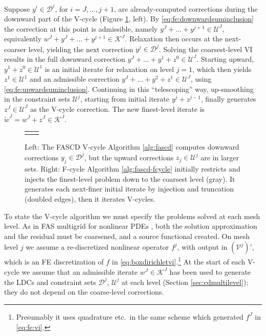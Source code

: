 \documentclass[review,hidelinks,onefignum,onetabnum]{siamart220329}
\newcommand{\cV}{\mathcal{V}}
\begin{document}
Suppose $y^i \in \mathcal{D}^i$, for $i=J,\dots,j+1$, are already-computed corrections during the downward part of the V-cycle (Figure \ref{fig:fascdcycles}, left).  By \eqref{eq:fe:downwardsuminclusion} the correction at this point is admissible, namely $y^J + \dots + y^{j+1} \in \mathcal{U}^J$, equivalently $w^J + y^J + \dots + y^{j+1} \in \mathcal{K}^J$.  Relaxation then occurs at the next-coarser level, yielding the next correction $y^j \in \mathcal{D}^j$.  Solving the coarsest-level VI results in the full downward correction $y^J + \dots + y^1 + z^0 \in \mathcal{U}^J$.  Starting upward, $y^1 + z^0 \in \mathcal{U}^1$ is an initial iterate for relaxation on level $j=1$, which then yields $z^1 \in \mathcal{U}^1$ and an admissible correction $y^J + \dots + y^2 + z^1 \in \mathcal{U}^J$, using \eqref{eq:fe:upwardsuminclusion}.  Continuing in this ``telescoping'' way, up-smoothing in the constraint sets $\mathcal{U}^j$, starting from initial iterate $y^j+z^{j-1}$, finally generates $z^J\in \mathcal{U}^J$ as the V-cycle correction.  The new finest-level iterate is $\tilde{w}^J = w^J + z^J \in \mathcal{K}^J$.

\begin{figure}[ht]
\centering
\begin{tabular}{cc}

&

\end{tabular}
\caption{Left: The FASCD V-cycle Algorithm \ref{alg:fascd} computes downward corrections $y_j \in \mathcal{D}^j$, but the upward corrections $z_j\in\mathcal{U}^j$ are in larger sets. Right: F-cycle Algorithm \ref{alg:fascd-fcycle} initially restricts and injects the finest-level problem down to the coarsest level (gray).  It generates each next-finer initial iterate by injection and truncation (doubled edges), then it iterates V-cycles.}
\label{fig:fascdcycles}
\end{figure}

To state the V-cycle algorithm we must specify the problems solved at each mesh level.  As in FAS multigrid for nonlinear PDEs \cite{BrandtLivne2011,Bruneetal2015,Trottenbergetal2001}, both the solution approximation and the residual must be coarsened, and a source functional created.  On mesh level $j$ we assume a re-discretized nonlinear operator $f^j$, with output in $(\cV^j)'$, which is an FE discretization of $f$ in \eqref{eq:boxdirichletvi}.\footnote{Presumably it uses quadrature etc.~in the same scheme which generated $f^J$ in \eqref{eq:fe:vi}.}  At the start of each V-cycle we assume that an admissible iterate $w^J \in \mathcal{K}^J$ has been used to generate the LDCs and constraint sets $\mathcal{D}^j$, $\mathcal{U}^j$ at each level (Section \ref{sec:cdmultilevel}); they do not depend on the coarse-level corrections.
\end{document}
